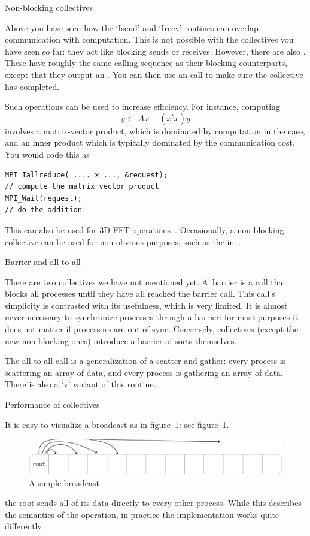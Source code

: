  {Non-blocking collectives}

Above you have seen how the `Isend' and `Irecv' routines can overlap communication
with computation. This is not possible with the collectives you have seen so far:
they act like blocking sends or receives.
However, there are also .
These have roughly the same calling sequence as their blocking counterparts,
except that they output an . You
can then use an  call to make sure the collective
has completed.

Such operations can be used to increase efficiency.
For instance, computing
\[ y \leftarrow Ax + (x^tx)y \]
involves a matrix-vector product, which is dominated by computation
in the  case, and an inner product which is 
typically dominated by the communication cost. You would code this as
\begin{verbatim}
MPI_Iallreduce( .... x ..., &request);
// compute the matrix vector product
MPI_Wait(request);
// do the addition
\end{verbatim}

This can also be used for 3D FFT operations~\cite{Hoefler:case-for-nbc}.
Occasionally, a non-blocking collective can be used for non-obvious purposes,
such as the  in~\cite{Hoefler:2010:SCP}.

 {Barrier and all-to-all}

There are two collectives we have not mentioned yet. A~barrier is a
call that blocks all processes until they have all reached the barrier
call. This call's simplicity is contrasted with its usefulness, which
is very limited. It is almost never necessary to synchronize processes
through a barrier: for most purposes it does not matter if processors
are out of sync. Conversely, collectives (except the new non-blocking
ones) introduce a barrier of sorts themselves.

The all-to-all call is a generalization of a scatter and gather: every
process is scattering an array of data, and every process is gathering
an array of data. There is also a `v' variant of this routine.

 {Performance of collectives}

It is easy to visualize a broadcast as in figure~\ref{fig:bcast-simple}:
see figure~\ref{fig:bcast-simple}.
\begin{figure}[ht]
  \includegraphics[scale=.08]{graphics/bcast-simple}
  \caption{A simple broadcast}
  \label{fig:bcast-simple}
\end{figure}
the root sends all of its data directly to every other process.
While this describes the semantics of the operation, in practice
the implementation works quite differently.

